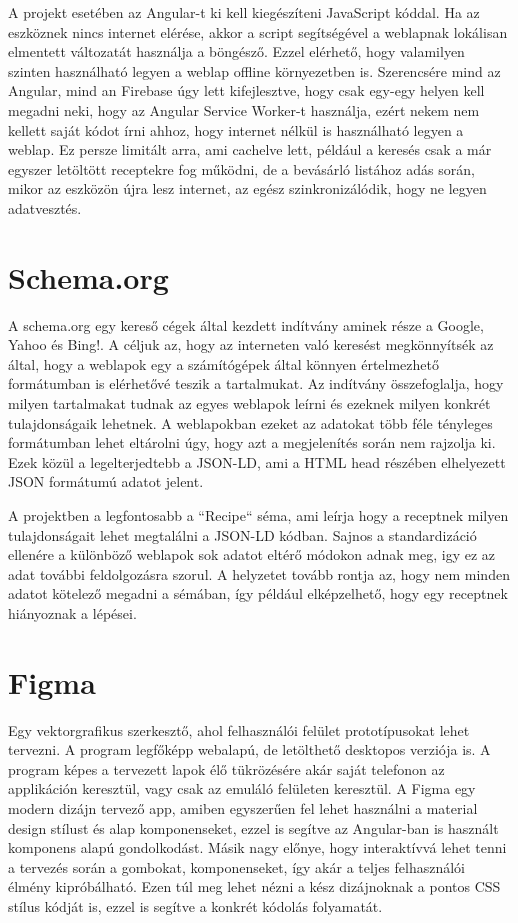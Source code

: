 \documentclass[12pt]{report}
\theoremstyle{definition}
\begin{document}
A projekt esetében az Angular-t ki kell kiegészíteni JavaScript kóddal. 
Ha az eszköznek nincs internet elérése, akkor a script segítségével a weblapnak lokálisan elmentett változatát használja a böngésző. 
Ezzel elérhető, hogy valamilyen szinten használható legyen a weblap offline környezetben is. Szerencsére mind az Angular, mind an Firebase úgy lett kifejlesztve, hogy csak egy-egy helyen kell megadni neki, hogy az Angular Service Worker-t használja, ezért nekem nem kellett saját kódot írni ahhoz, hogy internet nélkül is használható legyen a weblap. Ez persze limitált arra, ami cachelve lett, például a keresés csak a már egyszer letöltött receptekre fog működni, de a bevásárló listához adás során, mikor az eszközön újra lesz internet, az egész szinkronizálódik, hogy ne legyen adatvesztés.

\section{Schema.org}
A schema.org egy kereső cégek által kezdett indítvány aminek része a Google, Yahoo és Bing!. 
A céljuk az, hogy az interneten való keresést megkönnyítsék az által, hogy a weblapok egy a számítógépek által könnyen értelmezhető formátumban is elérhetővé teszik a tartalmukat. 
Az indítvány összefoglalja, hogy milyen tartalmakat tudnak az egyes weblapok leírni és ezeknek milyen konkrét tulajdonságaik lehetnek. 
A weblapokban ezeket az adatokat több féle tényleges formátumban lehet eltárolni úgy, hogy azt a megjelenítés során nem rajzolja ki. Ezek közül a legelterjedtebb a JSON-LD, ami a HTML head részében elhelyezett JSON formátumú adatot jelent.

A projektben a legfontosabb a “Recipe“ séma, ami leírja hogy a receptnek milyen tulajdonságait lehet megtalálni a JSON-LD kódban. 
Sajnos a standardizáció ellenére a különböző weblapok sok adatot eltérő módokon adnak meg, igy ez az adat további feldolgozásra szorul. 
A helyzetet tovább rontja az, hogy nem minden adatot kötelező megadni a sémában, így például elképzelhető, hogy egy receptnek hiányoznak a lépései. 


\section{Figma}
Egy  vektorgrafikus szerkesztő, ahol felhasználói felület prototípusokat lehet tervezni. A program legfőképp webalapú, de letölthető desktopos verziója is. 
A program képes a tervezett lapok élő tükrözésére akár saját telefonon az applikáción keresztül, vagy csak az emuláló felületen keresztül. 
A Figma egy modern dizájn tervező app, amiben egyszerűen fel lehet használni a material design stílust és alap komponenseket, ezzel is segítve az Angular-ban is használt komponens alapú gondolkodást. Másik nagy előnye, hogy interaktívvá lehet tenni a tervezés során a gombokat, komponenseket, így akár a teljes felhasználói élmény kipróbálható. Ezen túl meg lehet nézni a kész dizájnoknak  a pontos CSS stílus kódját is, ezzel is segítve a konkrét kódolás folyamatát.
\end{document}

